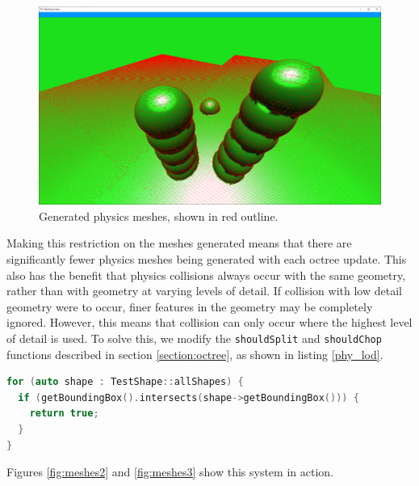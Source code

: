 \documentclass[11pt]{article}
\begin{document}
\begin{figure}[H]
  \includegraphics[width=\textwidth]{meshes1.png}
  \caption{Generated physics meshes, shown in red outline.}
  \label{fig:meshes1}
\end{figure}

Making this restriction on the meshes generated means that there are significantly fewer physics meshes being generated with each octree update. This also has the benefit that physics collisions always occur with the same geometry, rather than with geometry at varying levels of detail. If collision with low detail geometry were to occur, finer features in the geometry may be completely ignored. However, this means that collision can only occur where the highest level of detail is used. To solve this, we modify the \texttt{shouldSplit} and \texttt{shouldChop} functions described in section \ref{section:octree}, as shown in listing \ref{phy_lod}.

\begin{lstlisting}[language=C++,label={phy_lod},caption={Snippet from \texttt{shouldSplit} responsible for increasing the level of detail near a set of test physics objects. All chunks with bounding boxes that intersect the bounding box of a physics shape will be split until the highest detail level is reached. The octree refinement process described in section \ref{section:octree_refinement} ensures that this does not create any places where very different levels of detail are adjacent to each other.}]
for (auto shape : TestShape::allShapes) {
  if (getBoundingBox().intersects(shape->getBoundingBox())) {
    return true;
  }
}
\end{lstlisting}

Figures \ref{fig:meshes2} and \ref{fig:meshes3} show this system in action.
\end{document}
